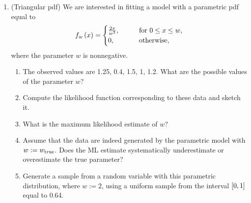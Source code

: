 \documentclass[12pt,twoside]{article}
\begin{document}
\begin{enumerate}
\item (Triangular pdf)
We are interested in fitting a model with a parametric pdf equal to
\begin{align}
f_{w}\left( x \right)  = \begin{cases}
 \frac{2x}{w^2}, \qquad & \text{for } 0 \leq x \leq w,\\
0, \qquad & \text{otherwise},
\end{cases}
\end{align}
where the parameter $w$ is nonnegative. 

\begin{enumerate}
\item The observed values are 1.25, 0.4, 1.5, 1, 1.2. What are the possible values of the parameter $w$? 
\item Compute the likelihood function corresponding to these data and sketch it. 
\item What is the maximum likelihood estimate of $w$? 
\item  Assume that the data are indeed generated by the parametric model with $w:=w_{\operatorname{true}}$. Does the ML estimate systematically underestimate or overestimate the true parameter? 
\item Generate a sample from a random variable with this parametric distribution, where $w:=2$, using a uniform sample from the interval $\left[ 0,1 \right]$ equal to 0.64.
\end{enumerate}


\end{enumerate}
\end{document}
